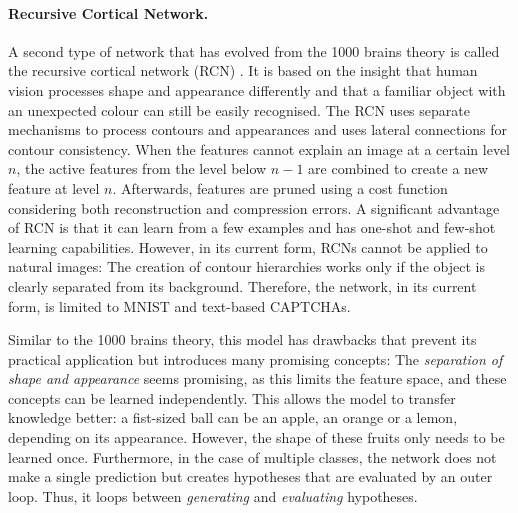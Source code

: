 \paragraph{Recursive Cortical Network.} A second type of network that has evolved from the 1000 brains theory is called the recursive cortical network (RCN) . It is based on the insight that human vision processes shape and appearance differently and that a familiar object with an unexpected colour can still be easily recognised.
The RCN uses separate mechanisms to process contours and appearances and uses lateral connections for contour consistency.
When the features cannot explain an image at a certain level $n$, the active features from the level below $n-1$ are combined to create a new feature at level $n$. Afterwards, features are pruned using a cost function considering both reconstruction and compression errors.
A significant advantage of RCN is that it can learn from a few examples and has one-shot and few-shot learning capabilities.
However, in its current form, RCNs cannot be applied to natural images: The creation of contour hierarchies works only if the object is clearly separated from its background. Therefore, the network, in its current form, is limited to MNIST \cite{lecun_gradient-based_1998} and text-based CAPTCHAs.

Similar to the 1000 brains theory, this model has drawbacks that prevent its practical application but introduces many promising concepts: The \emph{separation of shape and appearance} seems promising, as this limits the feature space, and these concepts can be learned independently. This allows the model to transfer knowledge better: a fist-sized ball can be an apple, an orange or a lemon, depending on its appearance. However, the shape of these fruits only needs to be learned once. Furthermore, in the case of multiple classes, the network does not make a single prediction but creates hypotheses that are evaluated by an outer loop. Thus, it loops between \emph{generating} and \emph{evaluating} hypotheses.

